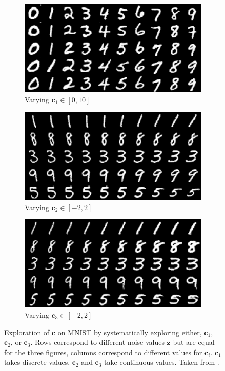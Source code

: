 \begin{figure}
    \centering
    \begin{subfigure}{.33\textwidth}
        \centering
        \includegraphics[width=.8\textwidth]{images/infogan_c1.png}
        \caption{Varying $\bm{c}_1 \in [0, 10]$}
    \end{subfigure}%
    \begin{subfigure}{.33\textwidth}
        \centering
        \includegraphics[width=.8\textwidth]{images/infogan_c2.png}
        \caption{Varying $\bm{c}_2 \in [-2, 2]$}
    \end{subfigure}
    \begin{subfigure}{.33\textwidth}
        \centering
        \includegraphics[width=.8\textwidth]{images/infogan_c3.png}
        \caption{Varying $\bm{c}_3 \in [-2, 2]$}
    \end{subfigure}
    \caption{Exploration of $\bm{c}$ on MNIST by systematically exploring either, $\bm{c}_1$, $\bm{c}_2$, or $\bm{c}_3$. Rows correspond to different noise values $\bm{z}$ but are equal for the three figures, columns correspond to different values for $\bm{c}_i$. $\bm{c}_1$ takes discrete values, $\bm{c}_2$ and $\bm{c}_3$ take continuous values. Taken from \citet{chen2016infogan}.}
    \label{fig:infogan}
\end{figure}

